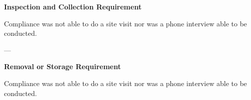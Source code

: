  

\textbf{Inspection and Collection Requirement} 

 

Compliance was not able to do a site visit nor was a phone interview able to be conducted.

--- 

\textbf{Removal or Storage Requirement} 

Compliance was not able to do a site visit nor was a phone interview able to be conducted. 
